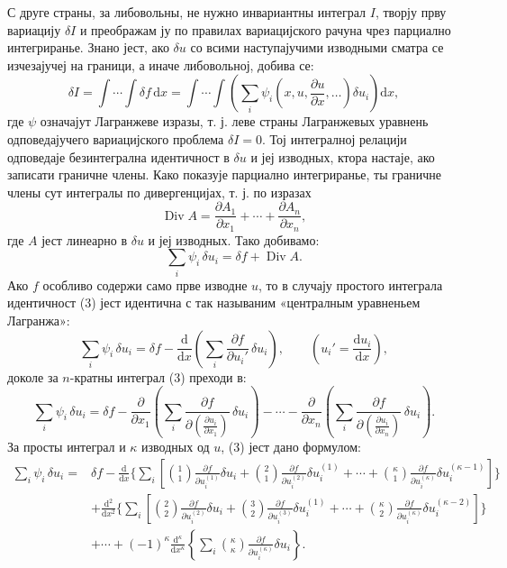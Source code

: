 ﻿\documentclass[11pt]{article}
\providecommand{\p}{\partial}
\providecommand{\dd}{\mathrm d}
\DeclareMathOperator{\Div}{Div}
\begin{document}
С друге страны, за либовольны, не нужно инвариантны интеграл \(I\), творју прву вариацију \(\delta I\) и преображам ју по правилах вариацијского рачуна чрез парциално интегриранье. Знано јест, ако \(\delta u\) со всими наступајучими изводными сматра се изчезајучеј на граници, а иначе либовольној, добива се:
\begin{equation}
\delta I=\int\!\cdots\!\int \delta f\,\dd x
=\int\!\cdots\!\int\left(\sum_i\psi_i\!\left(x,u,\frac{\p u}{\p x},\ldots\right)\delta u_i\right)\dd x,
\tag{2}
\end{equation}
где \(\psi\) означајут Лагранжеве изразы, т. ј. леве страны Лагранжевых уравнень одповедајучего вариацијского проблема \(\delta I=0\). Тој интегралној релацији одповедаје безинтегрална идентичност в \(\delta u\) и јеј изводных, ктора настаје, ако записати граничне члены. Како показује парциално интегриранье, ты граничне члены сут интегралы по дивергенцијах, т. ј. по изразах
\[
\Div A=\frac{\p A_1}{\p x_1}+\cdots+\frac{\p A_n}{\p x_n},
\]
где \(A\) јест линеарно в \(\delta u\) и јеј изводных. Тако добивамо:
\begin{equation}
\sum_i\psi_i\,\delta u_i=\delta f+\Div A.
\tag{3}
\end{equation}
Ако \(f\) особливо содержи само прве изводне \(u\), то в случају простого интеграла идентичност (3) јест идентична с так называним «централным уравненьем Лагранжа»:
\begin{equation}
\sum_i \psi_i\,\delta u_i
=\delta f-\frac{\dd}{\dd x}\left(\sum_i\frac{\p f}{\p u_i'}\,\delta u_i\right),
\qquad \left(u_i'=\frac{\dd u_i}{\dd x}\right),
\tag{4}
\end{equation}
доколе за \(n\)-кратны интеграл (3) преходи в:
\begin{equation}
\sum_i\psi_i\,\delta u_i
=
\delta f
-\frac{\p}{\p x_1}\left(\sum_i\frac{\p f}{\p \left(\frac{\p u_i}{\p x_1}\right)}\,\delta u_i\right)
-\cdots
-\frac{\p}{\p x_n}\left(\sum_i\frac{\p f}{\p \left(\frac{\p u_i}{\p x_n}\right)}\,\delta u_i\right).
\tag{5}
\end{equation}
За просты интеграл и \(\kappa\) изводных од \(u\), (3) јест дано формулом:
\begin{equation}
\begin{aligned}
\sum_i\psi_i\,\delta u_i
={}&\delta f
-\frac{\dd}{\dd x}\Bigg\{\sum_i\left[
\binom{1}{1}\frac{\p f}{\p u_i^{(1)}}\delta u_i
+\binom{2}{1}\frac{\p f}{\p u_i^{(2)}}\delta u_i^{(1)}
+\cdots+
\binom{\kappa}{1}\frac{\p f}{\p u_i^{(\kappa)}}\delta u_i^{(\kappa-1)}
\right]\Bigg\}\\
&+\frac{\dd^2}{\dd x^2}\Bigg\{\sum_i\left[
\binom{2}{2}\frac{\p f}{\p u_i^{(2)}}\delta u_i
+\binom{3}{2}\frac{\p f}{\p u_i^{(3)}}\delta u_i^{(1)}
+\cdots+
\binom{\kappa}{2}\frac{\p f}{\p u_i^{(\kappa)}}\delta u_i^{(\kappa-2)}
\right]\Bigg\}\\
&+\cdots
+(-1)^\kappa\frac{\dd^\kappa}{\dd x^\kappa}
\left\{\sum_i\binom{\kappa}{\kappa}
\frac{\p f}{\p u_i^{(\kappa)}}\delta u_i\right\}.
\end{aligned}
\tag{6}
\end{equation}
\end{document}
